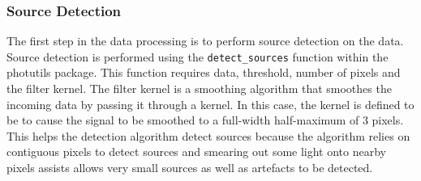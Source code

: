 \documentclass[a4paper,fleqn,usenatbib]{mnras}
\begin{document}
\subsubsection{Source Detection}
The first step in the data processing is to perform source detection on the data. Source detection is performed using the  \lstinline{detect_sources} function within the photutils package. This function requires data, threshold, number of pixels and the filter kernel. The filter kernel is a smoothing algorithm that smoothes the incoming data by passing it through a kernel. In this case, the kernel is defined to be to cause the signal to be smoothed to a full-width half-maximum of 3 pixels. This helps the detection algorithm detect sources because the algorithm relies on contiguous pixels to detect sources and smearing out some light onto nearby pixels assists allows very small sources as well as artefacts to be detected.
\end{document}
